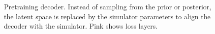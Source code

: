 \documentclass{kththesis}
\newcommand{\vph}{\boldsymbol{\phi}}
\newcommand{\vs}{\pmb{s}_t}
\newcommand{\va}{\pmb{a}_t}
\newcommand{\vns}{\pmb{s}_{t+1}}
\def\layersep{50pt}
\begin{document}
\begin{figure}
\begin{tikzpicture}[shorten >=1pt,->,draw=black!50, node distance=\layersep and \layersep, myarrow/.style={-Stealth}]
        
\end{tikzpicture}
\caption{Pretraining decoder. Instead of sampling from the prior or posterior, the latent space is replaced by the simulator parameters to align the decoder with the simulator. Pink shows loss layers.}
\label{fig_pretrain_decoder}

\end{figure}



        
    
    
        

        
    
    
\end{document}
